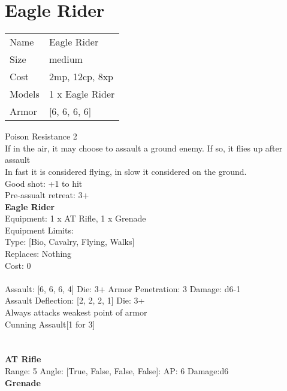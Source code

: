 \pagebreak\pagebreak

\section{ Eagle Rider }

\begin{tabular}{ll}
  Name & Eagle Rider \\
  Size & medium\\
  Cost & 2mp, 12cp, 8xp\\
  Models & 1 x Eagle Rider\\
  Armor & [6, 6, 6, 6]\\
\end{tabular}

\noindent Poison Resistance 2\\ 
If in the air, it may choose to assault a ground enemy. If so, it flies up after assault\\ 
In fast it is considered flying, in slow it considered on the ground.\\ 
Good shot: +1 to hit\\ 
Pre-assualt retreat: 3+\\ 


{\bf Eagle Rider } \\
Equipment: 1 x AT Rifle, 1 x Grenade \\
Equipment Limits:  \\
Type: [Bio, Cavalry, Flying, Walks] \\
Replaces: Nothing \\
Cost: 0\\
\ \\
Assault: [6, 6, 6, 4] Die: 3+ Armor Penetration: 3 Damage: d6-1 \\
Assault Deflection: [2, 2, 2, 1] Die: 3+\\
\indent Always attacks weakest point of armor\\ 
Cunning Assault[1 for 3]\\ 
 
\ \\

\ \\
{\bf AT Rifle } \\



Range: 5  Angle: [True, False, False, False]: AP: 6 Damage:d6 \\




{\bf Grenade } \\



